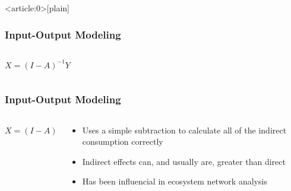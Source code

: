 \documentclass[aspectratio=169]{beamer}
\begin{document}
{ 
\begin{frame}<article:0>[plain]
   \frametitle{}
     \note[]{}
\end{frame}
}

\begin{frame}
  \frametitle{Input-Output Modeling}
\begin{columns}
\begin{column}{0.5\textwidth}
\begin{center}
$X = (I - A)^{-1}Y$
\end{center}
\end{column}
\begin{column}{0.5\textwidth}  %
\end{column}
\end{columns}
\end{frame}

\begin{frame}
  \frametitle{Input-Output Modeling}
\begin{columns}
\begin{column}{0.5\textwidth}
\begin{center}
$X = (I - A)^{-1}Y$
\end{center}
\end{column}
\begin{column}{0.5\textwidth}  %
  \begin{itemize}
  \item Uses a simple subtraction to calculate all of the indirect
  consumption correctly \pause
  \item Indirect effects can, and usually are, greater than direct \pause
  \item Has been influencial in ecosystem network analysis
  \end{itemize}
\end{column}
\end{columns}
\end{frame}
\end{document}
